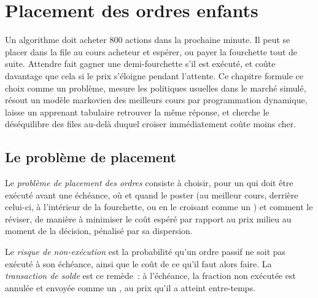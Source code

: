 \chapter{Placement des ordres enfants}\label{ch:mx:child-order-placement}

Un algorithme doit acheter 800 actions dans la prochaine minute. Il peut se placer dans la file au cours acheteur et espérer, ou payer la fourchette tout de suite. Attendre fait gagner une demi-fourchette
s'il est exécuté, et coûte davantage que cela si le prix s'éloigne pendant l'attente. Ce chapitre formule ce choix comme un problème, mesure les politiques usuelles dans le marché simulé,
résout un modèle markovien des meilleurs cours par programmation dynamique, laisse un apprenant tabulaire retrouver la même réponse, et
cherche le déséquilibre des files au-delà duquel croiser immédiatement coûte moins cher.

\section{Le problème de placement}

\begin{definition}\label{def:mx:child-order-placement:problem}
Le \emph{problème de placement des ordres} consiste à choisir, pour un  qui doit être exécuté avant une échéance, où et quand
le poster (au meilleur cours, derrière celui-ci, à l'intérieur de la fourchette, ou en le croisant comme un ) et comment le réviser, de manière à minimiser le
coût espéré par rapport au prix milieu au moment de la décision, pénalisé par sa dispersion.
\end{definition}

\begin{definition}\label{def:mx:child-order-placement:risk}
Le \emph{risque de non-exécution} est la probabilité qu'un ordre passif ne soit pas exécuté à son échéance, ainsi que le coût de ce qu'il faut alors faire. La
\emph{transaction de solde} est ce remède~: à l'échéance, la fraction non exécutée est annulée et envoyée comme un ,
au prix qu'il a atteint entre-temps.
\end{definition}

